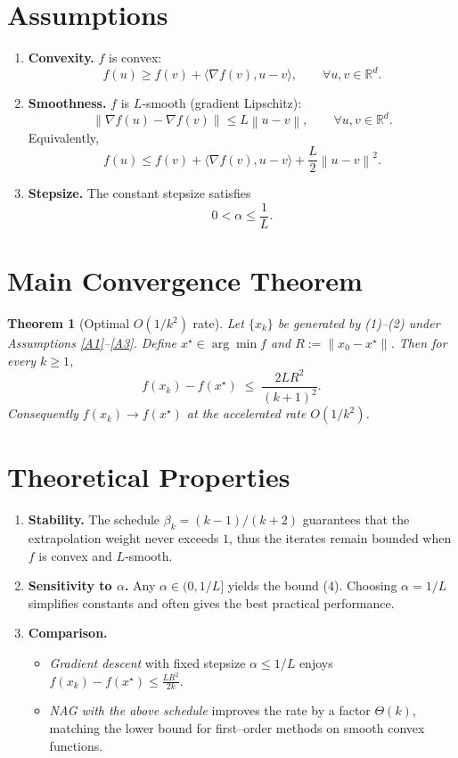 \documentclass{article}
\newtheorem{theorem}{Theorem}
\newcommand{\R}{\mathbb{R}}
\newcommand{\norm}[1]{\left\lVert#1\right\rVert}
\begin{document}
\section*{Assumptions}
\begin{enumerate}[label=(A\arabic*)]
\item \label{A1} \textbf{Convexity.} $f$ is convex:
\[
f(u)\ge f(v)+\langle\nabla f(v),u-v\rangle,\qquad \forall u,v\in\R^d.
\]
\item \label{A2} \textbf{Smoothness.} $f$ is $L$‑smooth (gradient Lipschitz):
\[
\norm{\nabla f(u)-\nabla f(v)}\le L\norm{u-v},\qquad \forall u,v\in\R^d.
\]
Equivalently,
\[
f(u)\le f(v)+\langle\nabla f(v),u-v\rangle+\frac{L}{2}\norm{u-v}^2 .
\tag{3}
\]
\item \label{A3} \textbf{Stepsize.} The constant stepsize satisfies
\[
0<\alpha\le\frac{1}{L}.
\]
\end{enumerate}

\section*{Main Convergence Theorem}
\begin{theorem}[Optimal $O(1/k^2)$ rate]\label{thm:rate}
Let $\{x_k\}$ be generated by (1)–(2) under Assumptions \ref{A1}–\ref{A3}.  
Define $x^{\star}\in\arg\min f$ and $R:=\norm{x_0-x^{\star}}$.  
Then for every $k\ge 1$,
\[
f(x_k)-f(x^{\star})\;\le\;\frac{2L R^{2}}{(k+1)^{2}} .
\tag{4}
\]
Consequently $f(x_k)\to f(x^{\star})$ at the accelerated rate $O(1/k^{2})$.
\end{theorem}

\section*{Theoretical Properties}
\begin{enumerate}[label=\arabic*.]
\item \textbf{Stability.} The schedule $\beta_k=(k-1)/(k+2)$ guarantees that the extrapolation weight never exceeds $1$, thus the iterates remain bounded when $f$ is convex and $L$‑smooth.
\item \textbf{Sensitivity to $\alpha$.} Any $\alpha\in(0,1/L]$ yields the bound (4). Choosing $\alpha=1/L$ simplifies constants and often gives the best practical performance.
\item \textbf{Comparison.}
    \begin{itemize}
        \item \emph{Gradient descent} with fixed stepsize $\alpha\le1/L$ enjoys $f(x_k)-f(x^{\star})\le \frac{L R^{2}}{2k}$.
        \item \emph{NAG with the above schedule} improves the rate by a factor $\Theta(k)$, matching the lower bound for first–order methods on smooth convex functions.
    \end{itemize}
\end{enumerate}
\end{document}
